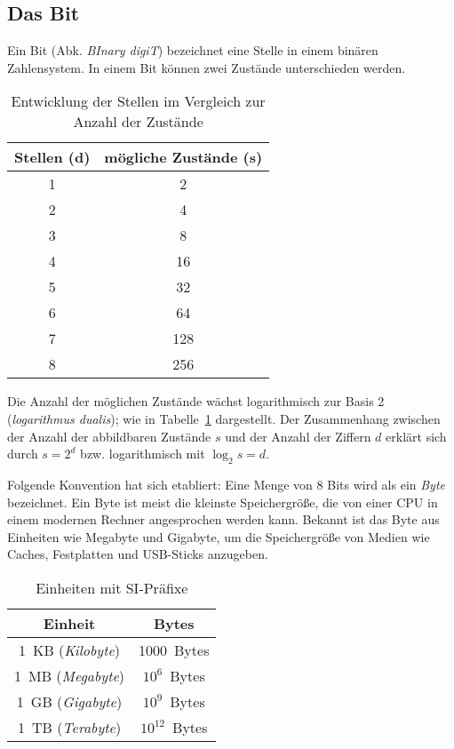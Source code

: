 \subsection{Das Bit}
%
Ein Bit (Abk. \emph{BInary digiT}) bezeichnet eine Stelle in einem
binären Zahlensystem. In einem Bit können zwei Zustände unterschieden werden.
%
\begin{table}[ht]
  \begin{center}
    \begin{tabular}{cc}
     \hline
      Stellen (d) & mögliche Zustände (s) \\
     \hline \hline
           1      &       2    \\
           2      &       4    \\
           3      &       8    \\
           4      &      16    \\
           5      &      32    \\
           6      &      64    \\
           7      &     128    \\
           8      &     256    \\
     \hline
    \end{tabular}
    \caption{Entwicklung der Stellen im Vergleich zur Anzahl der Zustände}
    \label{tab:digits_states}
  \end{center}
\end{table}
%
Die Anzahl der möglichen Zustände wächst logarithmisch zur Basis 2
(\emph{logarithmus dualis}); wie in Tabelle~\ref{tab:digits_states}
dargestellt. Der Zusammenhang zwischen der Anzahl der abbildbaren
Zustände $s$ und der Anzahl der Ziffern $d$ erklärt sich durch
$s = 2^d$ bzw. logarithmisch mit $\log_2{s} = d$.

Folgende Konvention hat sich etabliert:
Eine Menge von 8 Bits wird als ein \emph{Byte} bezeichnet.
Ein Byte ist meist die kleinste Speichergröße, die
von einer CPU in einem modernen Rechner angesprochen werden kann.
Bekannt ist das Byte aus Einheiten wie Megabyte und Gigabyte, um
die Speichergröße von Medien wie Caches, Festplatten und USB-Sticks
anzugeben.
%
\begin{table}[ht]
  \begin{center}
     \begin{tabular}{cc}
      \hline
       Einheit                 & Bytes \\
      \hline \hline
       1~KB (\emph{Kilobyte})  & 1000~Bytes \\
       1~MB (\emph{Megabyte})  & $10^6$~Bytes \\
       1~GB (\emph{Gigabyte})  & $10^9$~Bytes \\
       1~TB (\emph{Terabyte})  & $10^{12}$~Bytes \\
      \hline
     \end{tabular}
     \caption{Einheiten mit SI-Präfixe}
     \label{tab:si_units}
  \end{center}
\end{table}


